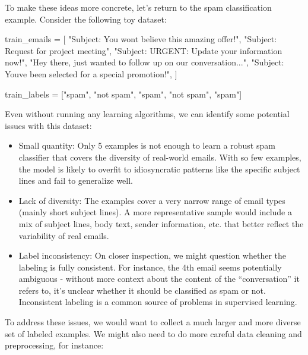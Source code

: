 \documentclass[
  9pt,
  letterpaper,
  abstract,
  titlepage]{scrbook}
\newenvironment{Shaded}{\begin{snugshade}}{\end{snugshade}}
\newcommand{\NormalTok}[1]{\textcolor[rgb]{0.00,0.23,0.31}{#1}}
\newcommand{\OperatorTok}[1]{\textcolor[rgb]{0.37,0.37,0.37}{#1}}
\newcommand{\StringTok}[1]{\textcolor[rgb]{0.13,0.47,0.30}{#1}}
\begin{document}
To make these ideas more concrete, let's return to the spam
classification example. Consider the following toy dataset:

\begin{Shaded}
\begin{Highlighting}[]
\NormalTok{train\_emails }\OperatorTok{=}\NormalTok{ [}
    \StringTok{"Subject: You won\textquotesingle{}t believe this amazing offer!"}\NormalTok{,}
    \StringTok{"Subject: Request for project meeting"}\NormalTok{,}
    \StringTok{"Subject: URGENT: Update your information now!"}\NormalTok{,}
    \StringTok{"Hey there, just wanted to follow up on our conversation..."}\NormalTok{,}
    \StringTok{"Subject: You\textquotesingle{}ve been selected for a special promotion!"}\NormalTok{,}
\NormalTok{]}

\NormalTok{train\_labels }\OperatorTok{=}\NormalTok{ [}\StringTok{"spam"}\NormalTok{, }\StringTok{"not spam"}\NormalTok{, }\StringTok{"spam"}\NormalTok{, }\StringTok{"not spam"}\NormalTok{, }\StringTok{"spam"}\NormalTok{]}
\end{Highlighting}
\end{Shaded}

Even without running any learning algorithms, we can identify some
potential issues with this dataset:

\begin{itemize}
\item
  Small quantity: Only 5 examples is not enough to learn a robust spam
  classifier that covers the diversity of real-world emails. With so few
  examples, the model is likely to overfit to idiosyncratic patterns
  like the specific subject lines and fail to generalize well.
\item
  Lack of diversity: The examples cover a very narrow range of email
  types (mainly short subject lines). A more representative sample would
  include a mix of subject lines, body text, sender information, etc.
  that better reflect the variability of real emails.
\item
  Label inconsistency: On closer inspection, we might question whether
  the labeling is fully consistent. For instance, the 4th email seems
  potentially ambiguous - without more context about the content of the
  ``conversation'' it refers to, it's unclear whether it should be
  classified as spam or not. Inconsistent labeling is a common source of
  problems in supervised learning.
\end{itemize}

To address these issues, we would want to collect a much larger and more
diverse set of labeled examples. We might also need to do more careful
data cleaning and preprocessing, for instance:
\end{document}
